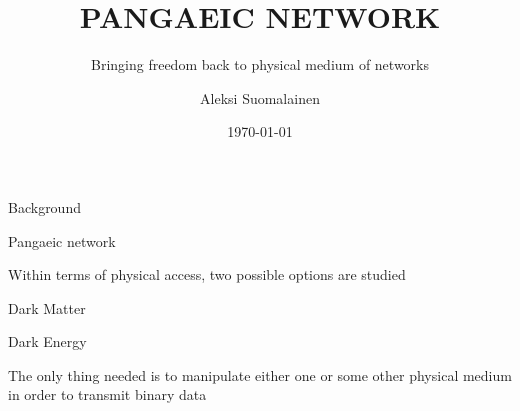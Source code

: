 \documentclass[14pt]{beamer}
\title{PANGAEIC NETWORK}
\subtitle{Bringing freedom back to physical medium of networks}
\author{Aleksi Suomalainen}
\institute{locusf.wordress.com}
\date{\today}
\begin{document}
\begin{frame}[plain]
\maketitle
\end{frame}

\begin{frame}{Background}
 \begin{fullpageitemize}
  \item \begin{center}\end{center}
  \item \begin{center}\end{center}
  \item \begin{center}\end{center}
 \end{fullpageitemize}
\end{frame}


\begin{frame}{Pangaeic network}
 \begin{fullpageitemize}
\item 
	\begin{center}
Within terms of physical access, two possible options are studied
    \end{center}
\item 
	\begin{center}
Dark Matter
    \end{center}
\item 
	\begin{center}
Dark Energy
    \end{center}

	\begin{center}
The only thing needed is to manipulate either one or some other physical medium in order to transmit binary data
    \end{center}

 \end{fullpageitemize}
\end{frame}
\end{document}
